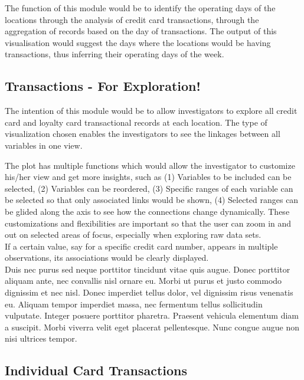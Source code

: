 \documentclass{acm_proc_article-sp}
\begin{document}
The function of this module would be to identify the operating days of
the locations through the analysis of credit card transactions, through
the aggregation of records based on the day of transactions. The output
of this visualisation would suggest the days where the locations would
be having transactions, thus inferring their operating days of the week.

\hypertarget{transactions---for-exploration}{%
\subsection{Transactions - For
Exploration!}\label{transactions---for-exploration}}

The intention of this module would be to allow investigators to explore
all credit card and loyalty card transactional records at each location.
The type of visualization chosen enables the investigators to see the
linkages between all variables in one view.

The plot has multiple functions which would allow the investigator to
customize his/her view and get more insights, such as (1) Variables to
be included can be selected, (2) Variables can be reordered, (3)
Specific ranges of each variable can be selected so that only associated
links would be shown, (4) Selected ranges can be glided along the axis
to see how the connections change dynamically. These customizations and
flexibilities are important so that the user can zoom in and out on
selected areas of focus, especially when exploring raw data sets.\\
If a certain value, say for a specific credit card number, appears in
multiple observations, its associations would be clearly displayed.\\
Duis nec purus sed neque porttitor tincidunt vitae quis augue. Donec
porttitor aliquam ante, nec convallis nisl ornare eu. Morbi ut purus et
justo commodo dignissim et nec nisl. Donec imperdiet tellus dolor, vel
dignissim risus venenatis eu. Aliquam tempor imperdiet massa, nec
fermentum tellus sollicitudin vulputate. Integer posuere porttitor
pharetra. Praesent vehicula elementum diam a suscipit. Morbi viverra
velit eget placerat pellentesque. Nunc congue augue non nisi ultrices
tempor.

\hypertarget{individual-card-transactions}{%
\subsection{Individual Card
Transactions}\label{individual-card-transactions}}
\end{document}
